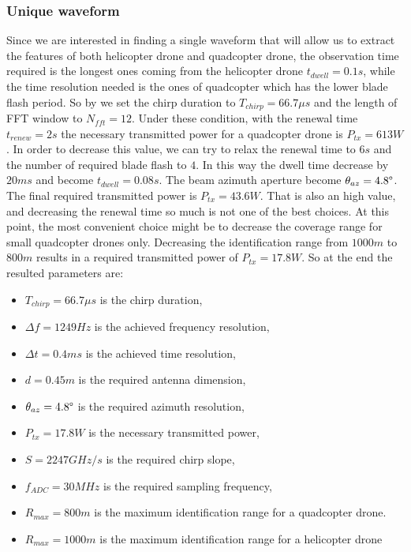 \subsubsection{Unique waveform}
Since we are interested in finding a single waveform that will allow us to extract the features of both helicopter drone and quadcopter drone, the observation time required is the longest ones coming from the helicopter drone $t_{dwell} = 0.1s$, while the time resolution needed is the ones of quadcopter which has the lower blade flash period. So by we set the chirp duration to $T_{chirp} = 66.7 \mu s$ and the length of FFT window to $N_{fft} = 12$. Under these condition, with the renewal time $t_{renew} = 2s$ the necessary transmitted power for a quadcopter drone is $P_{tx} = 613 W$. In order to decrease this value, we can try to relax the renewal time to $6 s$ and the number of required blade flash to $4$. In this way the dwell time decrease by $20 ms$ and become $t_{dwell} = 0.08 s$. The beam azimuth aperture become $\theta_{az} = 4.8\degree$. The final required transmitted power is $P_{tx} = 43.6 W$. That is also an high value, and decreasing the renewal time so much is not one of the best choices. At this point, the most convenient choice might be to decrease the coverage range for small quadcopter drones only. Decreasing the identification range from $1000 m$ to $800 m$ results in a required transmitted power of $P_{tx} = 17.8 W$. So at the end the resulted parameters are:

\begin{itemize}
    
    \item $T_{chirp} = 66.7 \mu s$ is the chirp duration,
    
    \item $\Delta f = 1249 Hz$ is the achieved frequency resolution,
    
    \item $\Delta t = 0.4 ms$ is the achieved time resolution,
    
    \item $d = 0.45 m$ is the required antenna dimension,
         
    \item $\theta_{az} = 4.8\degree$ is the required azimuth resolution,

    \item $P_{tx} = 17.8 W$ is the necessary transmitted power,
    
    \item $S = 2247 GHz/s$ is the required chirp slope,
    
    \item $f_{ADC} = 30 MHz$ is the required sampling frequency,
    
    \item $R_{max} = 800 m$ is the maximum identification range for a quadcopter drone.
    
    \item $R_{max} = 1000 m$ is the maximum identification range for a helicopter drone

    
\end{itemize}

